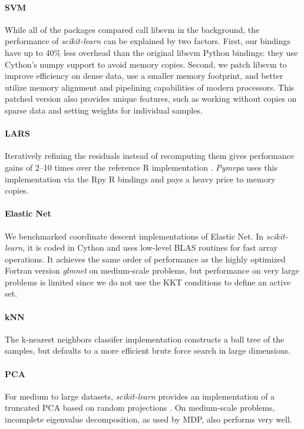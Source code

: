 \documentclass[twoside,11pt]{article}
\begin{document}
\paragraph{SVM}
%
While all of the packages compared call libsvm in the
background, the
performance of \emph{scikit-learn} can be explained by two factors.
First, our bindings have up to 40\% less overhead than the original
libsvm Python bindings: they use Cython's numpy support
to avoid memory copies. Second, we patch libsvm to improve efficiency
on dense data, use a smaller memory footprint, and better utilize memory
alignment and pipelining capabilities of modern processors. This patched
version also provides unique features, such as working without copies on
sparse data and setting weights for individual samples.


\paragraph{LARS}
%
Iteratively refining the residuals instead of recomputing them gives
performance gains of 2--10 times over the reference R implementation
\citep{LARS}. {\sl Pymvpa} uses this implementation via the Rpy R
bindings and pays a heavy price to memory copies.


\paragraph{Elastic Net}
%
We benchmarked coordinate descent implementations of Elastic Net.  In
\emph{scikit-learn}, it is coded in Cython and uses low-level BLAS
routines for fast array operations. It achieves the same order of
performance as the highly optimized Fortran version \emph{glmnet}
\citep{friedman2010} on medium-scale problems, but performance on very
large problems is limited since we do not use the KKT conditions to
define an active set.

\paragraph{kNN}
%
The k-nearest neighbors classifer implementation constructs a ball
tree \citep{omohundro1989} of the samples, but defaults to a more
efficient brute force search in large dimensions.

\paragraph{PCA}
%
For medium to large datasets, \emph{scikit-learn} provides an
implementation of a truncated PCA based on random projections
\citep{rokhlin2009}. On medium-scale problems, incomplete eigenvalue
decomposition, as used by MDP, also performs very well.
\end{document}
